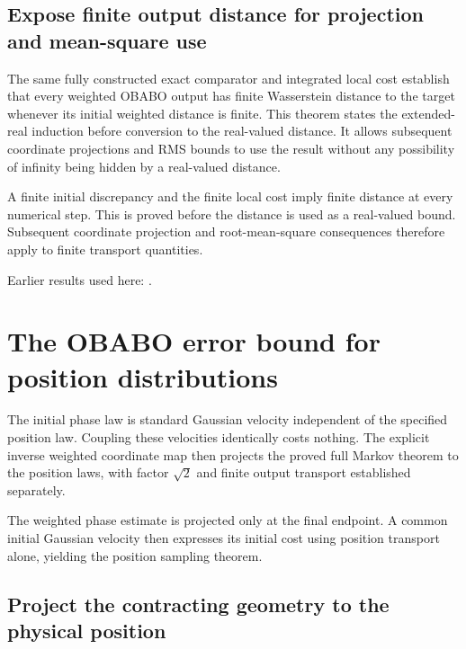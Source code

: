 \documentclass[11pt,a4paper]{report}
\begin{document}
\subsection{\texorpdfstring{Expose finite output distance for projection and mean-square use}{Expose finite output distance for projection and mean-square use}}
\label{report-step-KineticLangevin-OBABOBias-lean-4}


The same fully constructed exact comparator and integrated local cost establish that every weighted OBABO output has finite Wasserstein distance to the target whenever its initial weighted distance is finite. This theorem states the extended-real induction before conversion to the real-valued distance. It allows subsequent coordinate projections and RMS bounds to use the result without any possibility of infinity being hidden by a real-valued distance.



A finite initial discrepancy and the finite local cost imply finite distance at every numerical step. This is proved before the distance is used as a real-valued bound. Subsequent coordinate projection and root-mean-square consequences therefore apply to finite transport quantities.



Earlier results used here: \cite[Section~3.17.3]{LangevinLean2026ULASC}.
\section{\texorpdfstring{The OBABO error bound for position distributions}{The OBABO error bound for position distributions}}
\label{proof-module-KineticLangevin-OBABOPosition-lean}


The initial phase law is standard Gaussian velocity independent of the specified position law. Coupling these velocities identically costs nothing. The explicit inverse weighted coordinate map then projects the proved full Markov theorem to the position laws, with factor \(\sqrt 2\) and finite output transport established separately.



The weighted phase estimate is projected only at the final endpoint. A common initial Gaussian velocity then expresses its initial cost using position transport alone, yielding the position sampling theorem.

\subsection{\texorpdfstring{Project the contracting geometry to the physical position}{Project the contracting geometry to the physical position}}
\label{report-step-KineticLangevin-OBABOPosition-lean-1}
\end{document}
